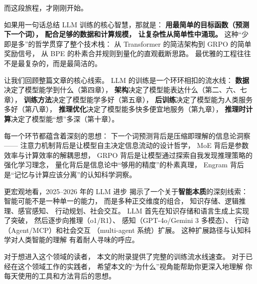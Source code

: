 而这段旅程，才刚刚开始。

如果用一句话总结 LLM 训练的核心智慧，那就是：
\textbf{用最简单的目标函数（预测下一个词），
配合足够的数据和计算规模，
让复杂性从简单性中涌现。}
这种“少即是多”的哲学贯穿了整个技术栈：
从 Transformer 的简洁架构到 GRPO 的简单奖励信号，
从 BPE 的朴素合并规则到量化的直观截断思路。
最优雅的工程往往不是最复杂的，而是最简洁的。

让我们回顾整篇文章的核心线索。
LLM 的训练是一个环环相扣的流水线：
\textbf{数据}决定了模型能学到什么（第四章），
\textbf{架构}决定了模型能表达什么（第二、六、七章），
\textbf{训练方法}决定了模型能学多好（第五章），
\textbf{后训练}决定了模型能为人类服务多好（第八章），
\textbf{推理优化}决定了模型能多快多便宜地服务（第九章），
\textbf{推理时计算}决定了模型能“想”多深（第十章）。

每一个环节都蕴含着深刻的思想：
下一个词预测背后是压缩即理解的信息论洞察——
注意力机制背后是让模型自主决定信息流动的设计哲学，
MoE 背后是参数效率与计算效率的解耦思想，
GRPO 背后是让模型通过探索自我发现推理策略的强化学习理念，
量化背后是信息论中“够用的精度”的朴素真理，
Engram 背后是“记忆与计算应该分离”的认知科学洞察。

更宏观地看，2025--2026 年的 LLM 进步
揭示了一个关于\textbf{智能本质}的深刻线索：
智能可能不是一种单一的能力，
而是多种正交维度的组合，
知识存储、逻辑推理、感官感知、
行动规划、社会交互。
LLM 首先在知识存储和语言生成上实现了突破，
然后逐步向推理（o1/R1）、
感知（GPT-4o/Gemini 3 多模态）、
行动（Agent/MCP）和社会交互
（multi-agent 系统）扩展。
这种扩展路径与认知科学对人类智能的理解
有着耐人寻味的呼应。

对于想进入这个领域的读者，
本文的附录提供了完整的训练流水线速查。
对于已经在这个领域工作的实践者，
希望本文的“为什么”视角能帮助你更深入地理解
你每天使用的工具和方法背后的思想。


